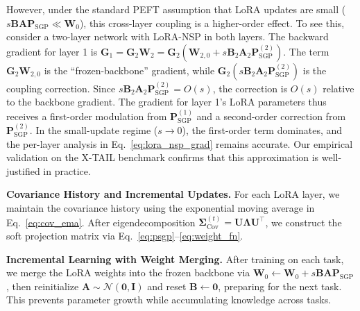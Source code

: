 \documentclass{article}
\begin{document}
However, under the standard PEFT assumption that LoRA updates are small ($s\mathbf{B}\mathbf{A}\mathbf{P}_{\text{SGP}} \ll \mathbf{W}_0$), this cross-layer coupling is a higher-order effect. To see this, consider a two-layer network with LoRA-NSP in both layers. The backward gradient for layer 1 is $\mathbf{G}_1 = \mathbf{G}_2 \mathbf{W}_2 = \mathbf{G}_2 (\mathbf{W}_{2,0} + s\mathbf{B}_2\mathbf{A}_2\mathbf{P}_{\text{SGP}}^{(2)})$. The term $\mathbf{G}_2 \mathbf{W}_{2,0}$ is the ``frozen-backbone'' gradient, while $\mathbf{G}_2 (s\mathbf{B}_2\mathbf{A}_2\mathbf{P}_{\text{SGP}}^{(2)})$ is the coupling correction. Since $s\mathbf{B}_2\mathbf{A}_2\mathbf{P}_{\text{SGP}}^{(2)} = O(s)$, the correction is $O(s)$ relative to the backbone gradient. The gradient for layer 1's LoRA parameters thus receives a first-order modulation from $\mathbf{P}_{\text{SGP}}^{(1)}$ and a second-order correction from $\mathbf{P}_{\text{SGP}}^{(2)}$. In the small-update regime ($s \to 0$), the first-order term dominates, and the per-layer analysis in Eq.~\eqref{eq:lora_nsp_grad} remains accurate. Our empirical validation on the X-TAIL benchmark confirms that this approximation is well-justified in practice.

\textbf{Covariance History and Incremental Updates.}
For each LoRA layer, we maintain the covariance history using the exponential moving average in Eq.~\eqref{eq:cov_ema}. After eigendecomposition $\mathbf{\Sigma}_{\text{Cov}}^{(t)} = \mathbf{U} \mathbf{\Lambda} \mathbf{U}^\top$, we construct the soft projection matrix via Eq.~\eqref{eq:psgp}--\eqref{eq:weight_fn}.

\textbf{Incremental Learning with Weight Merging.}
After training on each task, we merge the LoRA weights into the frozen backbone via $\mathbf{W}_0 \leftarrow \mathbf{W}_0 + s\mathbf{B}\mathbf{A}\mathbf{P}_{\text{SGP}}$, then reinitialize $\mathbf{A} \sim \mathcal{N}(\mathbf{0},\mathbf{I})$ and reset $\mathbf{B} \leftarrow \mathbf{0}$, preparing for the next task. This prevents parameter growth while accumulating knowledge across tasks.
\end{document}
